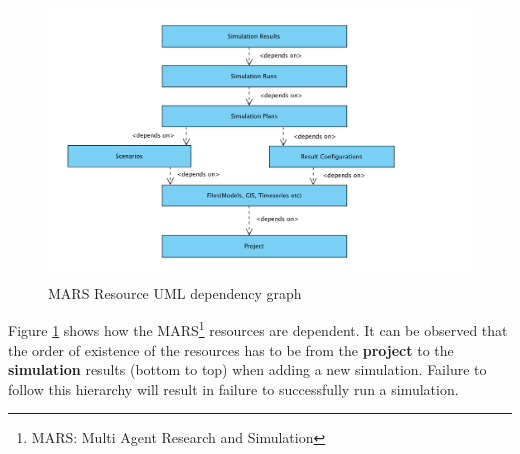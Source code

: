         \begin{figure}[H]
            \centering \includegraphics[scale=0.6]{grafiken/marsDependency.png}
            \caption{MARS Resource UML dependency graph \cite{DepDiagram}}
            \label{fig:marsDependency}
        \end{figure}
        
        Figure \ref{fig:marsDependency} shows how the MARS\footnote{MARS: Multi Agent Research and Simulation} 
        resources are dependent. It can be observed
        that the order of existence of the resources has to be from the \textbf{project} to the \textbf{simulation} results 
        (bottom to top) when adding a new simulation. Failure to follow this hierarchy will result in failure to
        successfully run a simulation.


